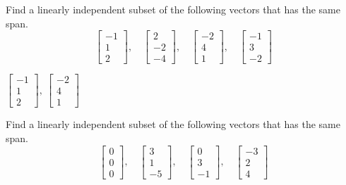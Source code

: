 \begin{exercise}
Find a linearly independent subset of the following vectors that has
the same span.
\begin{equation*}
\begin{bmatrix}
-1 \\ 1 \\ 2
\end{bmatrix}
, \quad
\begin{bmatrix}
2 \\ -2 \\ -4
\end{bmatrix}
, \quad
\begin{bmatrix}
-2 \\ 4 \\ 1
\end{bmatrix}
, \quad
\begin{bmatrix}
-1 \\ 3 \\ -2
\end{bmatrix}
\end{equation*}
\end{exercise}
\comboSol{%
}
{%
$\left[\begin{smallmatrix} -1\\ 1\\ 2 \end{smallmatrix}\right],\ \left[\begin{smallmatrix} -2 \\4  \\1 \end{smallmatrix}\right]$
}

\begin{exercise}\ansMark%
Find a linearly independent subset of the following vectors that has
the same span.
\begin{equation*}
\begin{bmatrix}
0 \\ 0 \\ 0
\end{bmatrix}
, \quad
\begin{bmatrix}
3 \\ 1 \\ -5
\end{bmatrix}
, \quad
\begin{bmatrix}
0 \\ 3 \\ -1
\end{bmatrix}
, \quad
\begin{bmatrix}
-3 \\ 2 \\ 4
\end{bmatrix}
\end{equation*}
\end{exercise}
\exsol{%
$\left[\begin{smallmatrix}
3 \\ 1 \\ -5
\end{smallmatrix}\right]
, 
\left[\begin{smallmatrix}
0 \\ 3 \\ -1
\end{smallmatrix}\right]$
}

